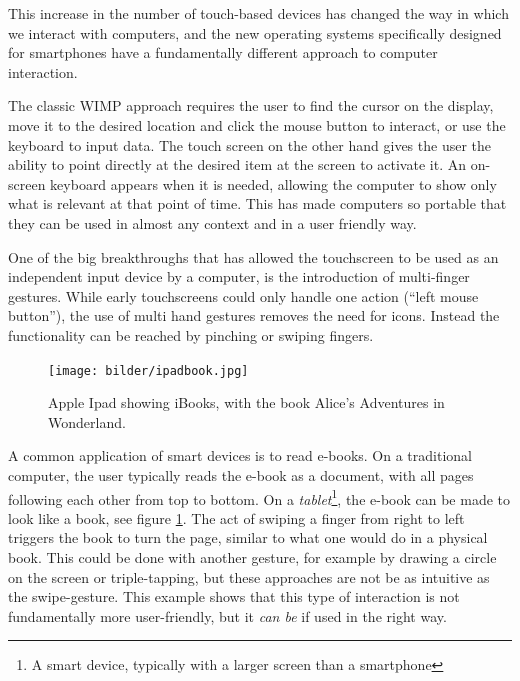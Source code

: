 This increase in the number of touch-based devices has changed the way in which we interact with computers, and the new operating systems specifically designed for smartphones have a fundamentally different approach to computer interaction.

The classic WIMP approach requires the user to find the cursor on the display, move it to the desired location and click the mouse button to interact, or use the keyboard to input data. The touch screen on the other hand gives the user the ability to point directly at the desired item at the screen to activate it. An on-screen keyboard appears when it is needed, allowing the computer to show only what is relevant at that point of time. This has made computers so portable that they can be used in almost any context and in a user friendly way.

One of the big breakthroughs that has allowed the touchscreen to be used as an independent input device by a computer, is the introduction of multi-finger gestures. While early touchscreens could only handle one action (``left mouse button''), the use of multi hand gestures removes the need for icons. Instead the functionality can be reached by pinching or swiping fingers.

\begin{figure}[]
\texttt{[image: bilder/ipadbook.jpg]}
\caption{Apple Ipad showing iBooks, with the book Alice's Adventures in Wonderland.}
\label{ibooks}
\end{figure}
\nocite{ipadbook}

A common application of smart devices is to read e-books. On a traditional computer, the user typically reads the e-book as a document, with all pages following each other from top to bottom. On a \emph{tablet}\footnote{A smart device, typically with a larger screen than a smartphone}, the e-book can be made to look like a book, see figure \ref{ibooks}. The act of swiping a finger from right to left triggers the book to turn the page, similar to what one would do in a physical book. This could be done with another gesture, for example by drawing a circle on the screen or triple-tapping, but these approaches are not be as intuitive as the swipe-gesture. This example shows that this type of interaction is not fundamentally more user-friendly, but it \emph{can be} if used in the right way. 


